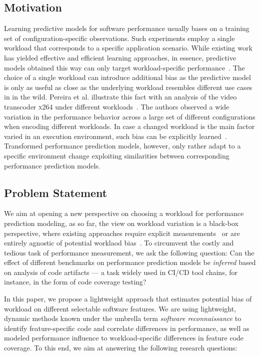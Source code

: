 \documentclass[conference]{IEEEtran}
\begin{document}
\subsection{Motivation}
Learning predictive models for software performance usually bases on a training set of configuration-specific observations. Such experiments employ a single workload that corresponds to a specific application scenario. While existing work has yielded effective and efficient learning approaches, in essence, predictive models obtained this way can only target workload-specific performance~\cite{siegmund_performance-influence_2015,haDeepPerf2019,guoVariabilityawarePerformancePrediction2013,guo_2018_data,sarkarCostEfficientSamplingPerformance}. The choice of a single workload can introduce additional bias as the predictive model is only as useful as close as the underlying workload resembles different use cases in in the wild. Pereira et al. illustrate this fact with an analysis of the video transcoder \textsc{x264} under different workloads~\cite{alves_sampling_2020}. The authors observed a wide variation in the performance behavior across a large set of different configurations when encoding different workloads. In case a changed workload is the main factor varied in an execution environment, such bias can be explicitly learned~\cite{jamishidi_transfer_2017,jamshidi_learning_2018,jamshidi_transfer_gp_2017,ding_bayesian_2020}. Transformed performance prediction models, however, only rather adapt to a specific environment change exploiting similarities between corresponding performance prediction models.

\subsection{Problem Statement}
We aim at opening a new perspective on choosing a workload for performance prediction modeling, as so far, the view on workload variation is a black-box perspective, where existing approaches require explicit measurements~\cite{jamishidi_transfer_2017,jamshidi_learning_2018,jamshidi_transfer_gp_2017} or are entirely agnostic of potential worklaod bias~\cite{liao_2020_using_emse}. To circumvent the costly and tedious task of performance measurement, we ask the following question: Can the effect of different benchmarks on performance prediction models be \emph{inferred} based on analysis of code artifacts --- a task widely used in CI/CD tool chains, for instance, in the form of code coverage testing?

In this paper, we propose a lightweight approach that estimates potential bias of workload on different selectable software features. We are using lightweight, dynamic methods known under the umbrella term \emph{software reconnaissance} to identify feature-specific code and correlate differences in performance, as well as modeled performance influence to workload-specific differences in feature code coverage. To this end, we aim at answering the following research questions:
\end{document}
